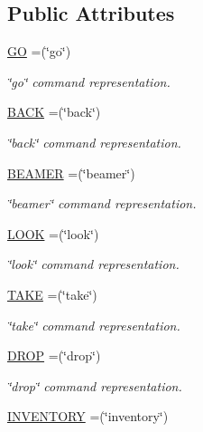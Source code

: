 \subsection*{Public Attributes}
\begin{DoxyCompactItemize}
\item 
\hyperlink{enumCommandWord_ab85d8b5fa5f3890548bff9a1ccfba218}{G\-O} =(\char`\"{}go\char`\"{})
\begin{DoxyCompactList}\small\item\em \char`\"{}go\char`\"{} command representation. \end{DoxyCompactList}\item 
\hyperlink{enumCommandWord_a3309e549607eb8de673c296db55f7517}{B\-A\-C\-K} =(\char`\"{}back\char`\"{})
\begin{DoxyCompactList}\small\item\em \char`\"{}back\char`\"{} command representation. \end{DoxyCompactList}\item 
\hyperlink{enumCommandWord_ab916560f94837341b38c83aa3cf5497f}{B\-E\-A\-M\-E\-R} =(\char`\"{}beamer\char`\"{})
\begin{DoxyCompactList}\small\item\em \char`\"{}beamer\char`\"{} command representation. \end{DoxyCompactList}\item 
\hyperlink{enumCommandWord_ae56e5a1529f673fe19373fed2717cd8c}{L\-O\-O\-K} =(\char`\"{}look\char`\"{})
\begin{DoxyCompactList}\small\item\em \char`\"{}look\char`\"{} command representation. \end{DoxyCompactList}\item 
\hyperlink{enumCommandWord_ac113629c0d6a8ebe3f4050a50d904a17}{T\-A\-K\-E} =(\char`\"{}take\char`\"{})
\begin{DoxyCompactList}\small\item\em \char`\"{}take\char`\"{} command representation. \end{DoxyCompactList}\item 
\hyperlink{enumCommandWord_a68dbdfb6cdd48bebfc70980afad6d453}{D\-R\-O\-P} =(\char`\"{}drop\char`\"{})
\begin{DoxyCompactList}\small\item\em \char`\"{}drop\char`\"{} command representation. \end{DoxyCompactList}\item 
\hyperlink{enumCommandWord_a624e48d45c9a1c4f614c62faa553c855}{I\-N\-V\-E\-N\-T\-O\-R\-Y} =(\char`\"{}inventory\char`\"{})

\end{DoxyCompactItemize}
